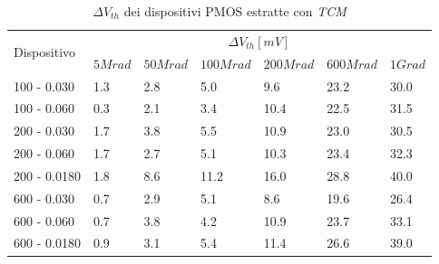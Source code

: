 \documentclass[
	a4paper,
	cleardoublepage=empty,
	headings=twolinechapter,
	numbers=autoenddot,
]{scrbook}
\begin{document}
\begin{table}[H]
  \renewcommand{\arraystretch}{1.3}
  \begin{tabular}{m{2.1cm}  m{1.1cm} m{1.3cm} m{1.5cm} m{1.5cm} m{1.5cm} m{1cm}}
    \toprule
    \multirow{2}{*}{Dispositivo} & \multicolumn{6}{c}{$\Delta V_{th} [mV] $}                                                          \\
    \cmidrule{2-7}
                                 & $5Mrad$                                   & $50Mrad$ & $100Mrad$ & $200Mrad$ & $600Mrad$ & $1Grad$ \\
    \midrule
    100 - 0.030                     & 1.3                                       & 2.8      & 5.0       & 9.6       & 23.2      & 30.0    \\
    \hline
    100 - 0.060                     & 0.3                                       & 2.1      & 3.4       & 10.4      & 22.5      & 31.5    \\
    \hline
    200 - 0.030                     & 1.7                                       & 3.8      & 5.5       & 10.9      & 23.0      & 30.5    \\
    \hline
    200 - 0.060                     & 1.7                                       & 2.7      & 5.1       & 10.3      & 23.4      & 32.3    \\
    \hline
    200 - 0.0180                    & 1.8                                       & 8.6      & 11.2      & 16.0      & 28.8      & 40.0    \\
    \hline
    600 - 0.030                     & 0.7                                       & 2.9      & 5.1       & 8.6       & 19.6      & 26.4    \\
    \hline
    600 - 0.060                     & 0.7                                       & 3.8      & 4.2       & 10.9      & 23.7      & 33.1    \\
    \hline
    600 - 0.0180                    & 0.9                                       & 3.1      & 5.4       & 11.4      & 26.6      & 39.0    \\
    \bottomrule
  \end{tabular}
  \caption{$\Delta V_{th}$ dei dispositivi PMOS estratte con \emph{TCM}}
  \label{tab:deltaVthTCMP}
\end{table}
\end{document}
